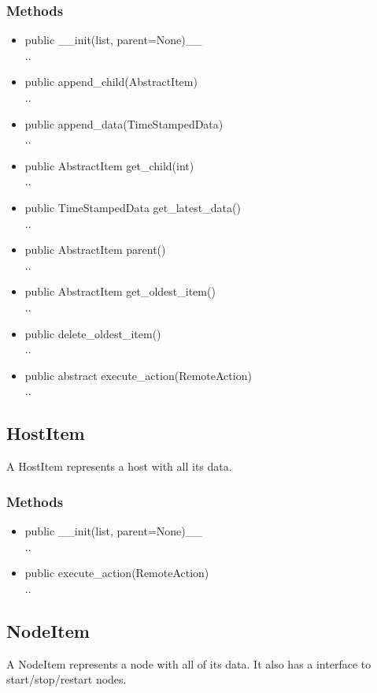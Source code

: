 \subsubsection{Methods}
\begin{itemize}
  \item public \_\_init(list, parent=None)\_\_\\
  ..
  \item public append\_child(AbstractItem)\\
  ..
  \item public append\_data(TimeStampedData)\\
  ..
  \item public AbstractItem get\_child(int)\\
  ..
  \item public TimeStampedData get\_latest\_data()\\
  ..
  \item public AbstractItem parent()\\
  ..
  \item public AbstractItem get\_oldest\_item()\\
  ..
  \item public delete\_oldest\_item()\\
  ..
  \item public abstract execute\_action(RemoteAction)\\
  ..  
\end{itemize}

\subsection{HostItem}
A HostItem represents a host with all its data.
\subsubsection{Methods}
\begin{itemize}
  \item public \_\_init(list, parent=None)\_\_\\
  ..
  \item public execute\_action(RemoteAction)\\
  ..
\end{itemize}

\subsection{NodeItem}
 A NodeItem represents a node with all of its data. It also has a interface to start/stop/restart nodes.
